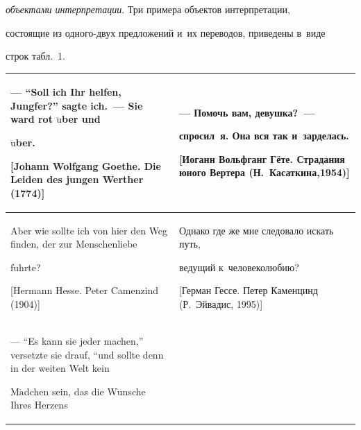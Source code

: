 \textit{объектами интерпретации}. Три примера объектов интерпретации, 


состоящие из одного-двух предложений и~их переводов, приведены в~виде 


строк табл.~1.


  


\begin{table}\small


\begin{center}




\vspace*{2ex}





\begin{tabular}{|p{63mm}|p{59mm}|}


\hline


--- ``Soll ich Ihr helfen, Jungfer?'' sagte ich.~--- Sie ward rot $\ddot{\mbox{u}}$ber und 


$\ddot{\mbox{u}}$ber.\newline


[Johann Wolfgang Goethe. Die Leiden des jungen Werther (1774)]&--- Помочь вам, девушка?~--- 


спросил~я. Она вся так и~зарделась.\newline


[Иоганн Вольфганг Гёте. Страдания юного Вертера (Н.~Касаткина,1954)]\\


\hline


Aber wie sollte ich von hier den Weg finden, der zur Menschenliebe 


f$\ddot{\mbox{u}}$hrte?\newline


[Hermann Hesse. Peter Camenzind (1904)]&Однако где же мне следовало искать путь, 


ведущий к~человеколюбию?\newline


[Герман Гессе. Петер Каменцинд (Р.~Эйвадис, 1995)]\\


\hline


--- ``Es kann sie jeder machen,'' versetzte sie drauf, ``und sollte denn in der weiten Welt kein 


M$\ddot{\mbox{a}}$dchen sein, das die W$\ddot{\mbox{u}}$nsche Ihres Herzens 



\end{tabular}
\end{center}
\end{table}
